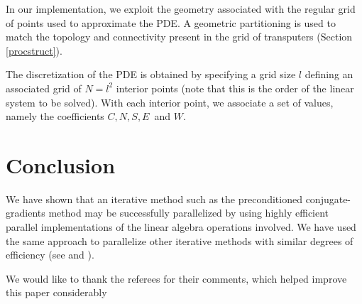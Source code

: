 \documentclass{ecai}
\begin{document}
In our implementation, we exploit the geometry associated with the
regular grid of points used to approximate the PDE. A geometric
partitioning is used to match the topology and connectivity present in
the grid of transputers (Section \ref{procstruct}).

The discretization of the PDE is obtained by specifying a grid size
$l$ defining an associated grid of $N=l^2$ interior points (note that
this is the order of the linear system to be solved). With each
interior point, we associate a set of values, namely the coefficients
$C, N, S, E\,$ and $W$.

\section{Conclusion}
We have shown that an iterative method such as the preconditioned
conjugate-gradients method may be successfully parallelized by using
highly efficient parallel implementations of the linear algebra
operations involved. We have used the same approach to parallelize
other iterative methods with similar degrees of efficiency (see
\cite{kn:daCunha92a} and \cite {kn:daCunha92b}).

\ack We would like to thank the referees for their comments, which
helped improve this paper considerably


\end{document}
